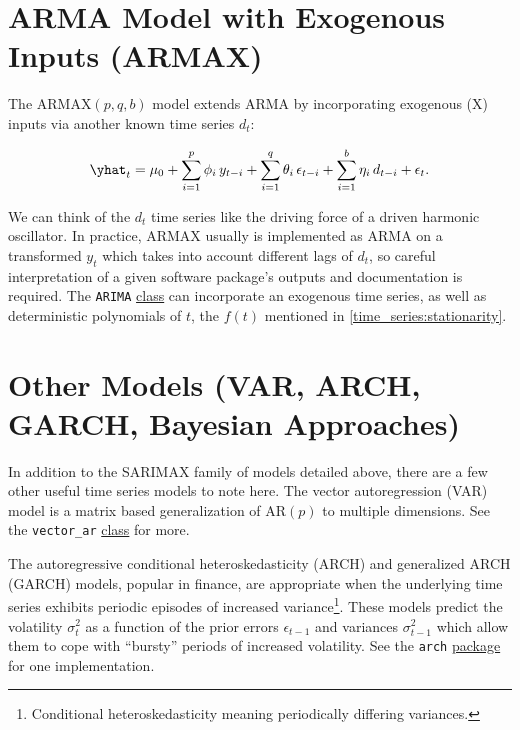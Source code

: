 \section{ARMA Model with Exogenous Inputs (ARMAX)}
\label{time_series:ARMAX}

The $\text{ARMAX}\left(p,q,b\right)$ model
extends ARMA by incorporating exogenous (X) inputs
via another known time series $d_{t}$:

\begin{equation}\label{eq:time_series:ARMAX}
\yhat_{t} = \mu_{0} + \sum_{i=1}^{p} \phi_{i}\, y_{t-i} + \sum_{i=1}^{q} \theta_{i}\, \epsilon_{t-i} + \sum_{i=1}^{b} \eta_{i}\, d_{t-i} + \epsilon_{t}.
\end{equation}

We can think of the $d_{t}$ time series like the driving force of a driven harmonic oscillator.
In practice, ARMAX usually is implemented as ARMA on
a transformed $y_{t}$ which takes into account different lags of $d_{t}$,
so careful interpretation of a given software package's outputs and documentation is required.
The \texttt{ARIMA}
\href{https://www.statsmodels.org/stable/generated/statsmodels.tsa.arima.model.ARIMA.html}{class}
can incorporate an exogenous time series,
as well as deterministic polynomials of $t$,
\ie the $f\left(t\right)$ mentioned in \cref{time_series:stationarity}.

\section{Other Models (VAR, ARCH, GARCH, Bayesian Approaches)}
\label{time_series:other_models}

In addition to the SARIMAX family of models detailed above,
there are a few other useful time series models to note here.
The vector autoregression (VAR) model is a matrix based
generalization of $\text{AR}\left(p\right)$ to multiple dimensions.
See the \texttt{vector\_ar}
\href{https://www.statsmodels.org/stable/generated/statsmodels.tsa.vector_ar.var_model.VAR.html}{class} for more.

The autoregressive conditional heteroskedasticity (ARCH) and generalized ARCH (GARCH) models,
popular in finance, are appropriate when the underlying time series
exhibits periodic episodes of increased variance\footnote{Conditional heteroskedasticity meaning periodically differing variances.}.
These models predict the volatility $\sigma_{t}^{2}$ as a function of
the prior errors $\epsilon_{t-1}$ and variances $\sigma_{t-1}^{2}$
which allow them to cope with ``bursty'' periods of increased volatility.
See the \texttt{arch}
\href{https://arch.readthedocs.io/en/stable/univariate/introduction.html}{package}
for one implementation.

